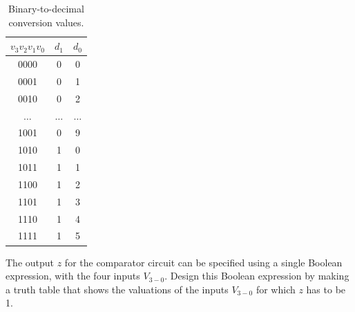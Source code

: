 \documentclass[epsfig,10pt,fullpage]{article}
\begin{document}
\begin{table}[H]
\begin{center}
\begin{tabular}{c|c c}
$v_3 v_2 v_1 v_0$& $d_1$&$d_0$\\ \hline
\hspace{0.75 mm} {\rule[0mm]{0mm}{5mm}0000} & 0 & 0\\ 
\hspace{0.75 mm} 0001 & 0 & 1\\
\hspace{0.75 mm} 0010 & 0 & 2\\
\hspace{0.75 mm} {\rule[0mm]{0mm}{2.5mm}$\ldots$} & $\ldots$ & $\ldots$ \\
\hspace{0.75 mm} {\rule[0mm]{0mm}{5mm}1001} & 0 & 9\\
\hspace{0.75 mm} 1010 & 1 & 0\\
\hspace{0.75 mm} 1011 & 1 & 1\\
\hspace{0.75 mm} 1100 & 1 & 2\\
\hspace{0.75 mm} 1101 & 1 & 3\\
\hspace{0.75 mm} 1110 & 1 & 4\\
\hspace{0.75 mm} 1111 & 1 & 5\\
\end{tabular}
	\caption{Binary-to-decimal conversion values.}
	\label{tab:BtD}
\end{center}
\end{table}

The output $z$ for the comparator circuit can be specified using a 
single Boolean expression, with the four inputs $V_{3-0}$. 
Design this Boolean expression by making a truth table that shows the valuations of 
the inputs $V_{3-0}$ for which $z$ has to be 1. 
\end{document}
